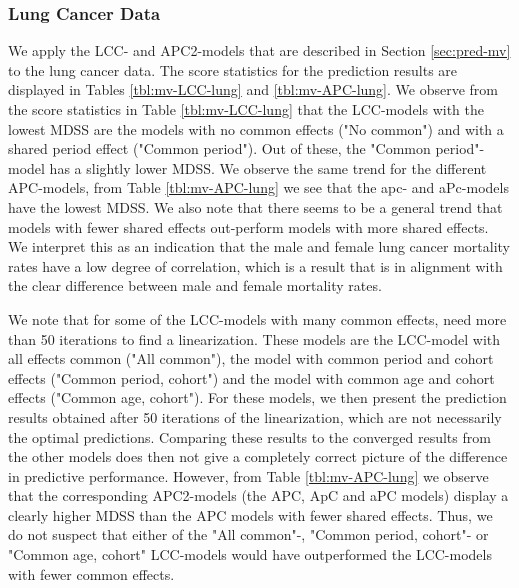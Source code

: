 \subsubsection{Lung Cancer Data}
\label{sec:mv-lung}
We apply the LCC- and APC2-models that are described in Section \ref{sec:pred-mv} to the lung cancer data. The score statistics for the prediction results are displayed in Tables \ref{tbl:mv-LCC-lung} and \ref{tbl:mv-APC-lung}. We observe from the score statistics in Table \ref{tbl:mv-LCC-lung} that the LCC-models with the lowest MDSS are the models with no common effects ("No common") and with a shared period effect ("Common period"). Out of these, the "Common period"-model has a slightly lower MDSS. We observe the same trend for the different APC-models, from Table \ref{tbl:mv-APC-lung} we see that the apc- and aPc-models have the lowest MDSS. We also note that there seems to be a general trend that models with fewer shared effects out-perform models with more shared effects. We interpret this as an indication that the male and female lung cancer mortality rates have a low degree of correlation, which is a result that is in alignment with the clear difference between male and female mortality rates. 

\newpar We note that for some of the LCC-models with many common effects, \inlabru need more than 50 iterations to find a linearization. These models are the LCC-model with all effects common ("All common"), the model with common period and cohort effects ("Common period, cohort") and the model with common age and cohort effects ("Common age, cohort"). For these models, we then present the prediction results obtained after 50 iterations of the linearization, which are not necessarily the optimal predictions. Comparing these results to the converged results from the other models does then not give a completely correct picture of the difference in predictive performance. However, from Table \ref{tbl:mv-APC-lung} we observe that the corresponding APC2-models (the APC, ApC and aPC models) display a clearly higher MDSS than the APC models with fewer shared effects. Thus, we do not suspect that either of the "All common"-, "Common period, cohort"- or "Common age, cohort" LCC-models would have outperformed the LCC-models with fewer common effects.

